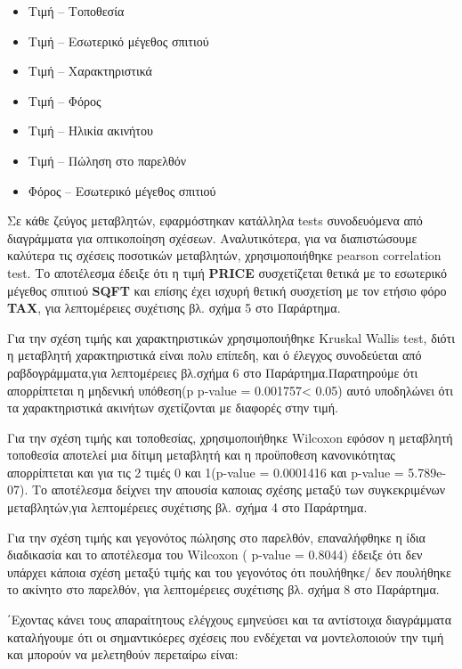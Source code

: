 \documentclass[
  10pt,
]{article}
\begin{document}
\begin{itemize}
  \item Τιμή -- Τοποθεσία
  \item Τιμή -- Εσωτερικό μέγεθος σπιτιού
  \item Τιμή -- Χαρακτηριστικά
  \item Τιμή -- Φόρος
  \item Τιμή -- Ηλικία ακινήτου
  \item Τιμή -- Πώληση στο παρελθόν
  \item Φόρος -- Εσωτερικό μέγεθος σπιτιού
\end{itemize}

Σε κάθε ζεύγος μεταβλητών, εφαρμόστηκαν κατάλληλα tests συνοδευόμενα από
διαγράμματα για οπτικοποίηση σχέσεων. Αναλυτικότερα, για να
διαπιστώσουμε καλύτερα τις σχέσεις ποσοτικών μεταβλητών, χρησιμοποιήθηκε
pearson correlation test. Το αποτέλεσμα έδειξε ότι η τιμή \textbf{PRICE}
συσχετίζεται θετικά με το εσωτερικό μέγεθος σπιτιού \textbf{SQFT} και
επίσης έχει ισχυρή θετική συσχετίση με τον ετήσιο φόρο \textbf{TAX}, για
λεπτομέρειες συχέτισης βλ. σχήμα 5 στο Παράρτημα.

Για την σχέση τιμής και χαρακτηριστικών χρησιμοποιήθηκε Kruskal Wallis
test, διότι η μεταβλητή χαρακτηριστικά είναι πολυ επίπεδη, και ό έλεγχος
συνοδεύεται από ραβδογράμματα,για λεπτομέρειες βλ.σχήμα 6 στο
Παράρτημα.Παρατηρούμε ότι απορρίπτεται η μηδενική υπόθεση(p p-value =
0.001757\textless{} 0.05) αυτό υποδηλώνει ότι τα χαρακτηριστικά ακινήτων
σχετίζονται με διαφορές στην τιμή.

Για την σχέση τιμής και τοποθεσίας, χρησιμοποιήθηκε Wilcoxon εφόσον η
μεταβλητή τοποθεσία αποτελεί μια δίτιμη μεταβλητή και η προϋποθεση
κανονικότητας απορρίπτεται και για τις 2 τιμές 0 και 1(p-value =
0.0001416 και p-value = 5.789e-07). Το αποτέλεσμα δείχνει την απουσία
καποιας σχέσης μεταξύ των συγκεκριμένων μεταβλητών,για λεπτομέρειες
συχέτισης βλ. σχήμα 4 στο Παράρτημα.

Για την σχέση τιμής και γεγονότος πώλησης στο παρελθόν, επαναλήφθηκε η
ίδια διαδικασία και το αποτέλεσμα του Wilcoxon ( p-value = 0.8044)
έδειξε ότι δεν υπάρχει κάποια σχέση μεταξύ τιμής και του γεγονότος ότι
πουλήθηκε/ δεν πουλήθηκε το ακίνητο στο παρελθόν, για λεπτομέρειες
συχέτισης βλ. σχήμα 8 στο Παράρτημα.

΄Εχοντας κάνει τους απαραίτητους ελέγχους εμηνεύσει και τα αντίστοιχα
διαγράμματα καταλήγουμε ότι οι σημαντικόερες σχέσεις που ενδέχεται να
μοντελοποιούν την τιμή και μπορούν να μελετηθούν περεταίρω είναι:
\end{document}
